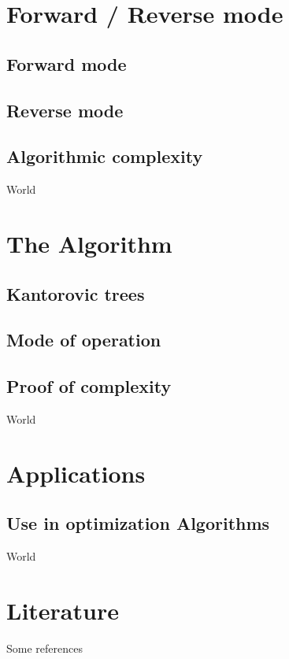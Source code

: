 \documentclass[compress]{beamer}
\begin{document}
\section{Forward / Reverse mode}
\subsection{Forward mode}
\subsection{Reverse mode}
\subsection{Algorithmic complexity}
\begin{frame}
	World
\end{frame}

\section{The Algorithm}
\subsection{Kantorovic trees}
\subsection{Mode of operation}
\subsection{Proof of complexity}

\begin{frame}
	World
\end{frame}

\section{Applications}
\subsection{Use in optimization Algorithms}

\begin{frame}
	World
\end{frame}

\section{Literature}
\begin{frame}
	Some references
\end{frame}
\end{document}

